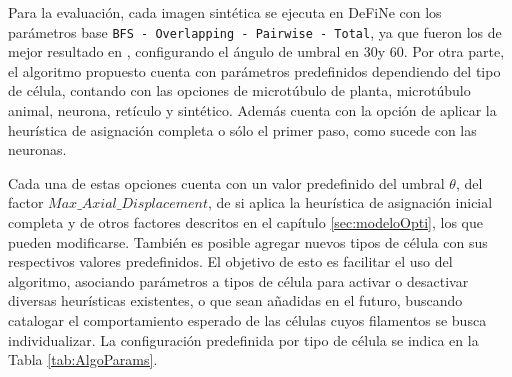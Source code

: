 Para la evaluaci\'on, cada imagen sint\'etica se ejecuta en DeFiNe con los par\'ametros base {\tt BFS - Overlapping - Pairwise - Total}, ya que fueron los de mejor resultado en \citet{breuer2015define}, configurando el \'angulo de umbral en 30\textdegree y 60\textdegree. 
Por otra parte, el algoritmo propuesto cuenta con par\'ametros predefinidos dependiendo del tipo de c\'elula, contando con las opciones de microt\'ubulo de planta, microt\'ubulo animal, neurona, ret\'iculo y sint\'etico. Adem\'as cuenta con la opci\'on de aplicar la heur\'istica de asignaci\'on completa o s\'olo el primer paso, como sucede con las neuronas. 

Cada una de estas opciones cuenta con un valor predefinido del umbral $\theta$, del factor $Max\_Axial\_Displacement$, de si aplica la heur\'istica de asignaci\'on inicial completa y de otros factores descritos en el cap\'itulo \ref{sec:modeloOpti}, los que pueden modificarse. Tambi\'en es posible agregar nuevos tipos de c\'elula con sus respectivos valores predefinidos. El objetivo de esto es facilitar el uso del algoritmo, asociando par\'ametros a tipos de c\'elula para activar o desactivar diversas heur\'isticas existentes, o que sean a\~nadidas en el futuro, buscando catalogar el comportamiento esperado de las c\'elulas cuyos filamentos se busca individualizar. La configuraci\'on predefinida por tipo de c\'elula se indica en la Tabla \ref{tab:AlgoParams}.



